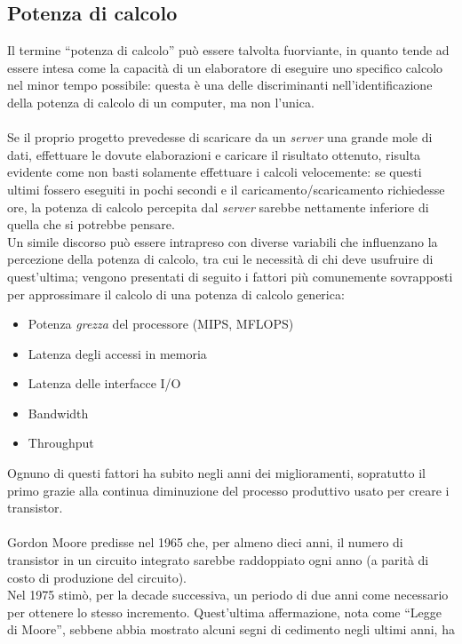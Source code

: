 \subsection{Potenza di calcolo}
Il termine ``potenza di calcolo'' può essere talvolta fuorviante, in quanto
tende ad essere intesa come la capacità di un elaboratore di eseguire uno
specifico calcolo nel minor tempo possibile: questa è una delle discriminanti
nell'identificazione della potenza di calcolo di un computer, ma non l'unica. 
\\ \\
Se il proprio progetto prevedesse di scaricare da un \emph{server} una grande
mole di dati, effettuare le dovute elaborazioni e caricare il risultato 
ottenuto, risulta evidente come non basti solamente effettuare i calcoli
velocemente: se questi ultimi fossero eseguiti in pochi secondi e il
caricamento/scaricamento richiedesse ore, la potenza di calcolo percepita
dal \emph{server} sarebbe nettamente inferiore di quella che si potrebbe
pensare. \\
Un simile discorso può essere intrapreso con diverse variabili che influenzano
la percezione della potenza di calcolo, tra cui le necessità di chi deve
usufruire di quest'ultima; vengono presentati di seguito i fattori più
comunemente sovrapposti per approssimare il calcolo di una potenza di calcolo
generica:
\newpage
\begin{itemize}
\item Potenza \emph{grezza} del processore (MIPS, MFLOPS)
\item Latenza degli accessi in memoria
\item Latenza delle interfacce I/O
\item Bandwidth
\item Throughput
\end{itemize}
Ognuno di questi fattori ha subito negli anni dei miglioramenti, sopratutto il
primo grazie alla continua diminuzione del processo produttivo usato per creare
i transistor.
\\ \\
Gordon Moore predisse nel 1965\citep{GMoore} che, 
per almeno dieci anni, il numero di transistor in un circuito integrato 
sarebbe raddoppiato ogni anno (a parità di costo di produzione del circuito). \\
Nel 1975 stimò, per la decade successiva, un periodo di due anni come 
necessario per ottenere lo stesso incremento. Quest'ultima affermazione, 
nota come ``Legge di Moore'', sebbene abbia mostrato alcuni segni di
cedimento negli ultimi anni\citep{MooresLaw}, ha 
